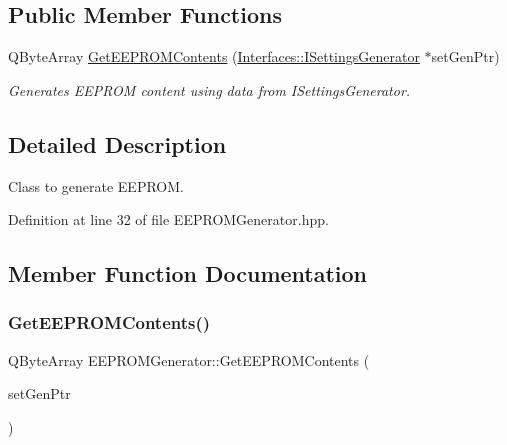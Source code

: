 \subsection*{Public Member Functions}
\begin{DoxyCompactItemize}
\item 
Q\+Byte\+Array \hyperlink{class_e_e_p_r_o_m_generator_a29a14421340137b191f3425d6bcc5cae}{Get\+E\+E\+P\+R\+O\+M\+Contents} (\hyperlink{class_interfaces_1_1_i_settings_generator}{Interfaces\+::\+I\+Settings\+Generator} $\ast$set\+Gen\+Ptr)
\begin{DoxyCompactList}\small\item\em Generates E\+E\+P\+R\+OM content using data from I\+Settings\+Generator. \end{DoxyCompactList}\end{DoxyCompactItemize}


\subsection{Detailed Description}
Class to generate E\+E\+P\+R\+OM. 

Definition at line 32 of file E\+E\+P\+R\+O\+M\+Generator.\+hpp.



\subsection{Member Function Documentation}
\mbox{\label{class_e_e_p_r_o_m_generator_a29a14421340137b191f3425d6bcc5cae}} 
\subsubsection{\texorpdfstring{Get\+E\+E\+P\+R\+O\+M\+Contents()}{GetEEPROMContents()}}
{\footnotesize\ttfamily Q\+Byte\+Array E\+E\+P\+R\+O\+M\+Generator\+::\+Get\+E\+E\+P\+R\+O\+M\+Contents (\begin{DoxyParamCaption}\item[{\hyperlink{class_interfaces_1_1_i_settings_generator}{Interfaces\+::\+I\+Settings\+Generator} $\ast$}]{set\+Gen\+Ptr }\end{DoxyParamCaption})\hspace{0.3cm}{\ttfamily [virtual]}}



